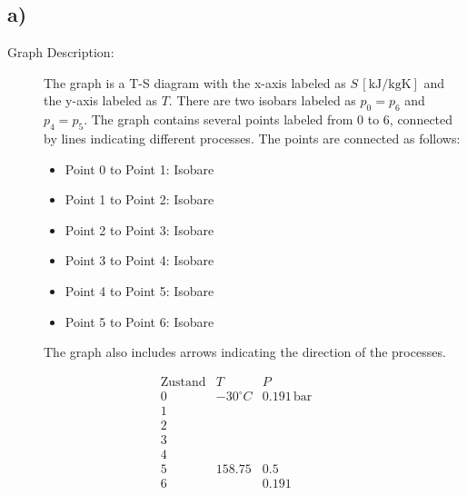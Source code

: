 

\subsection*{a)}

\begin{description}
    \item[Graph Description:] The graph is a T-S diagram with the x-axis labeled as $S \, [\text{kJ/kgK}]$ and the y-axis labeled as $T$. There are two isobars labeled as $p_0 = p_6$ and $p_4 = p_5$. The graph contains several points labeled from 0 to 6, connected by lines indicating different processes. The points are connected as follows:
    \begin{itemize}
        \item Point 0 to Point 1: Isobare
        \item Point 1 to Point 2: Isobare
        \item Point 2 to Point 3: Isobare
        \item Point 3 to Point 4: Isobare
        \item Point 4 to Point 5: Isobare
        \item Point 5 to Point 6: Isobare
    \end{itemize}
    The graph also includes arrows indicating the direction of the processes.
\end{description}

\[
\begin{array}{c|c|c}
\text{Zustand} & T & P \\
\hline
0 & -30^\circ C & 0.191 \, \text{bar} \\
1 & & \\
2 & & \\
3 & & \\
4 & & \\
5 & 158.75 & 0.5 \\
6 & & 0.191 \\
\end{array}
\]